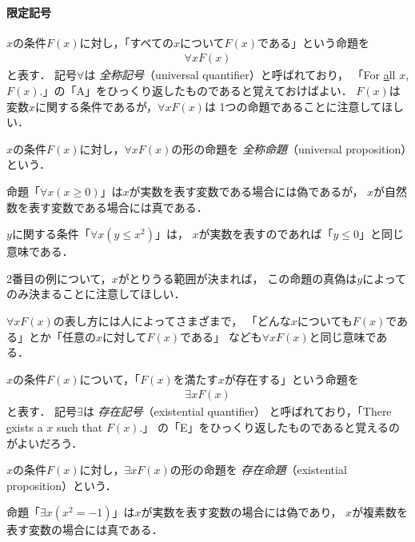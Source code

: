   \paragraph{限定記号}
  $x$の条件$F(x)$に対し，「すべての$x$について$F(x)$である」という命題を
  \begin{align}
    \forall x F(x)
    \label{eq:forall}
  \end{align}
  と表す．
  記号$\forall$は
  \emph{全称記号}（universal quantifier）と呼ばれており，
  「For \underline{a}ll $x$, $F(x)$.」の「A」をひっくり返したものであると覚えておけばよい．
  $F(x)$は変数$x$に関する条件であるが，$\forall x F(x)$は
  1つの命題であることに注意してほしい．

  $x$の条件$F(x)$に対し，$\forall x F(x)$の形の命題を
  \emph{全称命題}（universal proposition）という．
  \begin{ex}
    命題「$\forall x ( x \geq 0 )$」は$x$が実数を表す変数である場合には偽であるが，
    $x$が自然数を表す変数である場合には真である．
  
    $y$に関する条件$「\forall x ( y \leq x^2)$」は，
    $x$が実数を表すのであれば「$ y \leq 0$」と同じ意味である．
  \end{ex}
  2番目の例について，$x$がとりうる範囲が決まれば，
  この命題の真偽は$y$によってのみ決まることに注意してほしい．

  $\forall x F(x)$の表し方には人によってさまざまで，
  「どんな$x$についても$F(x)$である」とか「任意の$x$に対して$F(x)$である」
  なども$\forall x F(x) $と同じ意味である．

  $x$の条件$F(x)$について，「$F(x)$を満たす$x$が存在する」という命題を
  \begin{align}
    \exists x F(x)
    \label{eq:exists}
  \end{align}
  と表す．
  記号$\exists$は
  \emph{存在記号}（existential quantifier）
  と呼ばれており，「There \underline{e}xists a $x$ such that $F(x)$.」
  の「E」をひっくり返したものであると覚えるのがよいだろう．
  
  $x$の条件$F(x)$に対し，$\exists x F(x)$の形の命題を
  \emph{存在命題}（existential proposition）という．
  \begin{ex}
    命題「$\exists x ( x^2 = -1)$」は$x$が実数を表す変数の場合には偽であり，
    $x$が複素数を表す変数の場合には真である．
  \end{ex}

